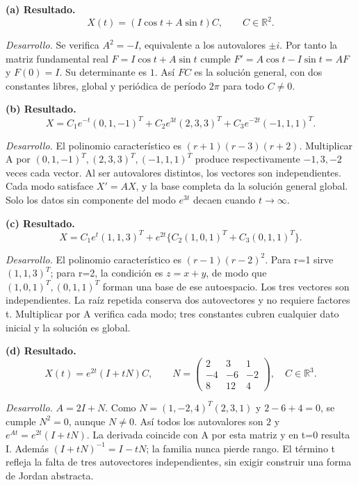 \noindent\textbf{(a) Resultado.} \[X(t)=(I\cos t+A\sin t)C,\qquad C\in\mathbb R^2.\]

\noindent\textit{Desarrollo.} Se verifica \(A^2=-I\), equivalente a los autovalores \(\pm i\).
Por tanto la matriz fundamental real \(F=I\cos t+A\sin t\) cumple
\(F'=A\cos t-I\sin t=AF\) y \(F(0)=I\). Su determinante es \(1\).
Así \(FC\) es la solución general, con dos constantes libres, global y periódica de período \(2\pi\)
para todo \(C\ne0\).

\medskip

\noindent\textbf{(b) Resultado.} \[X=C_1e^{-t}(0,1,-1)^T+C_2e^{3t}(2,3,3)^T+C_3e^{-2t}(-1,1,1)^T.\]

\noindent\textit{Desarrollo.} El polinomio característico es \((r+1)(r-3)(r+2)\).
Multiplicar A por \((0,1,-1)^T,\allowbreak (2,3,3)^T,\allowbreak (-1,1,1)^T\) produce respectivamente
\(-1,3,-2\) veces cada vector. Al ser autovalores distintos, los vectores son independientes.
Cada modo satisface \(X'=AX\), y la base completa da la solución general global.
Solo los datos sin componente del modo \(e^{3t}\) decaen cuando \(t\to\infty\).

\medskip

\noindent\textbf{(c) Resultado.} \[X=C_1e^t(1,1,3)^T+e^{2t}\{C_2(1,0,1)^T+C_3(0,1,1)^T\}.\]

\noindent\textit{Desarrollo.} El polinomio característico es \((r-1)(r-2)^2\).
Para r=1 sirve \((1,1,3)^T\); para r=2, la condición es \(z=x+y\), de modo que
\((1,0,1)^T,\allowbreak (0,1,1)^T\) forman una base de ese autoespacio. Los tres vectores
son independientes. La raíz repetida conserva dos autovectores y no requiere factores t.
Multiplicar por A verifica cada modo; tres constantes cubren cualquier dato inicial y la solución es global.

\medskip

\noindent\textbf{(d) Resultado.} \[X(t)=e^{2t}(I+tN)C,\qquad N=\begin{pmatrix}2&3&1\\-4&-6&-2\\8&12&4\end{pmatrix},\quad C\in\mathbb R^3.\]

\noindent\textit{Desarrollo.} \(A=2I+N\). Como \(N=(1,-2,4)^T(2,3,1)\) y \(2-6+4=0\), se cumple
\(N^2=0\), aunque \(N\ne0\). Así todos los autovalores son \(2\) y
\(e^{At}=e^{2t}(I+tN)\). La derivada coincide con A por esta matriz y en t=0 resulta I.
Además \((I+tN)^{-1}=I-tN\); la familia nunca pierde rango. El término t refleja
la falta de tres autovectores independientes, sin exigir construir una forma de Jordan abstracta.
